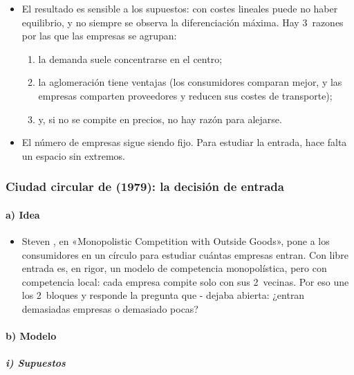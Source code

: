 \documentclass[11pt]{article}
\begin{document}
\begin{itemize}
\item El resultado es sensible a los supuestos: con costes lineales puede no haber equilibrio, y no siempre se observa la diferenciación máxima. Hay 3~razones por las que las empresas se agrupan\nocite{Tirole1988Theory}:
  \begin{enumerate}
  \item la demanda suele concentrarse en el centro;
  \item la aglomeración tiene ventajas (los consumidores comparan mejor, y las empresas comparten proveedores y reducen sus costes de transporte);
  \item y, si no se compite en precios, no hay razón para alejarse.
  \end{enumerate}
\item El número de empresas sigue siendo fijo. Para estudiar la entrada, hace falta un espacio sin extremos.
\end{itemize}

\subsubsection{Ciudad circular de  (1979): la decisión de entrada}\label{sec:salop}

\paragraph{a) Idea}

\begin{itemize}
\item Steven \textcite{Salop1979Monopolistic}, en «Monopolistic Competition with Outside Goods», pone a los consumidores en un círculo para estudiar cuántas empresas entran. Con libre entrada es, en rigor, un modelo de competencia monopolística, pero con competencia local: cada empresa compite solo con sus 2~vecinas. Por eso une los 2~bloques y responde la pregunta que - dejaba abierta: ¿entran demasiadas empresas o demasiado pocas?
\end{itemize}

\paragraph{b) Modelo}

\subparagraph{i) Supuestos}
\end{document}
